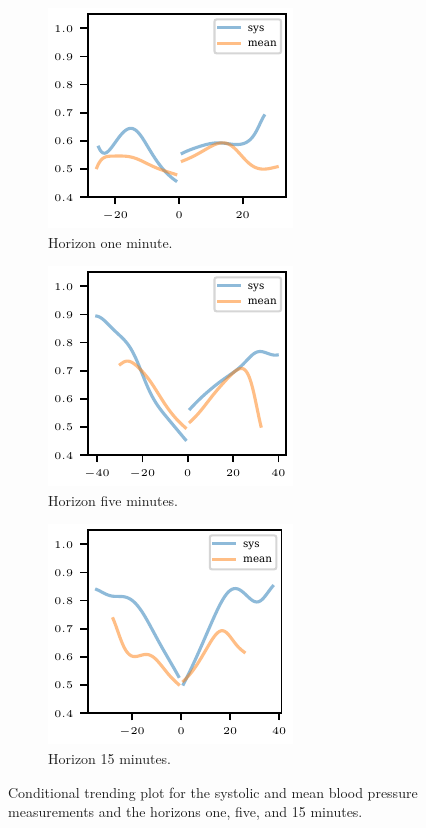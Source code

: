 \documentclass[pdflatex]{sn-jnl}
\theoremstyle{plain}%
\theoremstyle{definition}
\begin{document}
\begin{figure}
    \centering
    \begin{subfigure}[t]{.32\textwidth}
        \includegraphics{plots/mimic/cond_prob_diff_nbp_abp_lag1}
        \caption{Horizon one minute.}
    \end{subfigure}\hspace{0.01\textwidth}
    \begin{subfigure}[t]{.32\textwidth}
        \includegraphics{plots/mimic/cond_prob_diff_nbp_abp_lag5}
        \caption{Horizon five minutes.}
    \end{subfigure}\hspace{0.01\textwidth}
    \begin{subfigure}[t]{.32\textwidth}
        \includegraphics{plots/mimic/cond_prob_diff_nbp_abp_lag15}
        \caption{Horizon 15 minutes.}
    \end{subfigure}\hspace{0.01\textwidth}
    \caption{Conditional trending plot for the systolic and mean blood pressure measurements and the horizons one, five, and 15 minutes. }
    \label{fig:app-mimic-cond-prob}
\end{figure}
\end{document}
